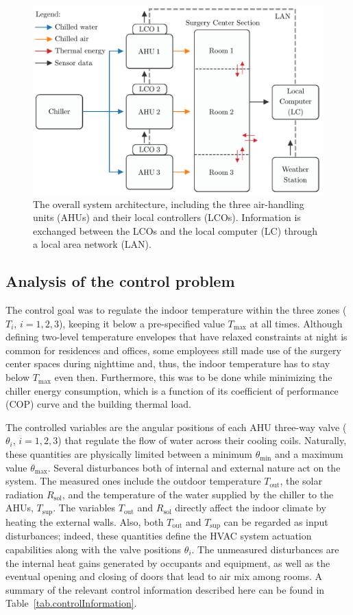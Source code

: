 \begin{figure}[!t]
	\centering
	\includegraphics[width=0.75\linewidth]{../images/chap3_sys_arch_diagram.pdf}
	\caption{The overall system architecture, including the three air-handling units (AHUs) and their local controllers (LCOs). Information is exchanged between the LCOs and the local computer (LC) through a local area network (LAN).}
	\label{fig.blockDiagram}
\end{figure}

\subsection{Analysis of the control problem}
\label{sec.controlProb}

The control goal was to regulate the indoor temperature within the three zones ($T_i$, $i=1,2,3$), keeping it below a pre-specified value $T_{\text{max}}$ at all times. Although defining two-level temperature envelopes that have relaxed constraints at night is common for residences and offices, some employees still made use of the surgery center spaces during nighttime and, thus, the indoor temperature has to stay below $T_{\text{max}}$ even then. Furthermore, this was to be done while minimizing the chiller energy consumption, which is a function of its coefficient of performance (COP) curve and the building thermal load. 

The controlled variables are the angular positions of each AHU three-way valve ($\theta_i$, $i=1,2,3$) that regulate the flow of water across their cooling coils. Naturally, these quantities are physically limited between a minimum $\theta_\text{min}$ and a maximum value $\theta_\text{max}$. Several disturbances both of internal and external nature act on the system. The measured ones include the outdoor temperature $T_\text{out}$, the solar radiation $R_\text{sol}$, and the temperature of the water supplied by the chiller to the AHUs, $T_\text{sup}$. The variables $T_\text{out}$ and $R_\text{sol}$ directly affect the indoor climate by heating the external walls. Also, both $T_\text{out}$ and $T_\text{sup}$ can be regarded as input disturbances; indeed, these quantities define the HVAC system actuation capabilities along with the valve positions $\theta_i$. The unmeasured disturbances are the internal heat gains generated by occupants and equipment, as well as the eventual opening and closing of doors that lead to air mix among rooms. A summary of the relevant control information described here can be found in Table~\ref{tab.controlInformation}.


